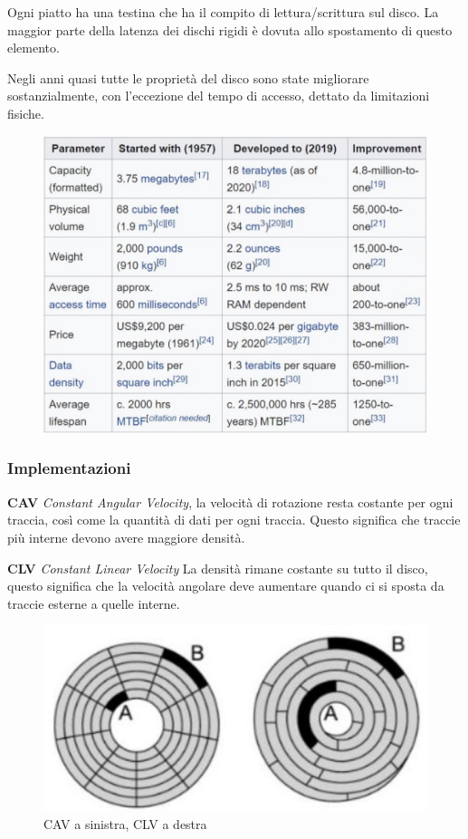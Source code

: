 Ogni piatto ha una testina che ha il compito di lettura/scrittura sul disco. La maggior parte della latenza dei dischi rigidi è dovuta allo spostamento di questo elemento.

Negli anni quasi tutte le proprietà del disco sono state migliorare sostanzialmente, con l'eccezione del tempo di accesso, dettato da limitazioni fisiche.

\begin{figure}[H]
    \centering
    \includegraphics[width=0.5\linewidth]{assets/hdd-improvement.jpg}
\end{figure}

\subsubsection{Implementazioni}
\begin{sitemize}
    \item \textbf{CAV} \textit{Constant Angular Velocity}, la velocità di rotazione resta costante per ogni traccia, così come la quantità di dati per ogni traccia. Questo significa che traccie più interne devono avere maggiore densità.
    \item \textbf{CLV} \textit{Constant Linear Velocity} La densità rimane costante su tutto il disco, questo significa che la velocità angolare deve aumentare quando ci si sposta da traccie esterne a quelle interne.
\end{sitemize}

\begin{figure}[H]
    \centering
    \includegraphics[width=0.5\linewidth]{assets/cav-clv.jpg}
    \caption{CAV a sinistra, CLV a destra}
\end{figure}

